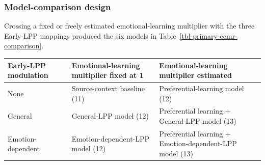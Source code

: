 \documentclass[
  man,
  longtable,
  nolmodern,
  notxfonts,
  notimes,
  draftfirst,
  colorlinks=true,linkcolor=blue,citecolor=blue,urlcolor=blue]{apa7}
\begin{document}
\subsubsection{Model-comparison design}\label{model-comparison-design}

Crossing a fixed or freely estimated emotional-learning multiplier with
the three Early-LPP mappings produced the six models in
Table~\ref{tbl-primary-ecmr-comparison}.

\begin{table}

{\caption{{Six models formed by crossing Early-LPP modulation with a
fixed or estimated emotional-learning multiplier. All models contained
temporal and negative/neutral source-context components; parenthetical
values are numbers of free parameters. Estimating the multiplier tested
the directional hypothesis of preferential emotional learning while also
permitting attenuation.}{\label{tbl-primary-ecmr-comparison}}}
\vspace{-20pt}}

\begin{longtable}[]{@{}
  >{\raggedright\arraybackslash}p{}
  >{\raggedright\arraybackslash}p{}
  >{\raggedright\arraybackslash}p{}@{}}
\toprule\noalign{}
\begin{minipage}[b]{\linewidth}\raggedright
Early-LPP modulation
\end{minipage} & \begin{minipage}[b]{\linewidth}\raggedright
Emotional-learning multiplier fixed at 1
\end{minipage} & \begin{minipage}[b]{\linewidth}\raggedright
Emotional-learning multiplier estimated
\end{minipage} \\
\midrule\noalign{}
\endhead
\bottomrule\noalign{}
\endlastfoot
None & Source-context baseline (11) & Preferential-learning model
(12) \\
General & General-LPP model (12) & Preferential learning + General-LPP
model (13) \\
Emotion-dependent & Emotion-dependent-LPP model (12) & Preferential
learning + Emotion-dependent-LPP model (13) \\
\end{longtable}

\end{table}
\end{document}
